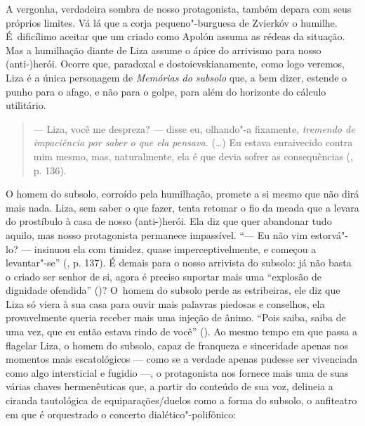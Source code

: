 A vergonha, verdadeira sombra de nosso protagonista, também depara com
seus próprios limites. Vá lá que a corja pequeno"-burguesa de Zvierkóv o
humilhe. É~dificílimo aceitar que um criado como Apolón assuma as rédeas
da situação. Mas a humilhação diante de Liza assume o ápice do arrivismo
para nosso \mbox{(anti-)herói}. Ocorre que, paradoxal e dostoievskianamente,
como logo veremos, Liza é a única personagem de \emph{Memórias do
subsolo} que, a bem dizer, estende o punho para o afago, e não para o
golpe, para além do horizonte do cálculo utilitário.

\begin{quote}
--- Liza, você me despreza? --- disse eu, olhando"-a fixamente,
\emph{tremendo de impaciência por saber o que ela pensava.} (\ldots) Eu
estava enraivecido contra mim mesmo, mas, naturalmente, ela é que devia
sofrer as consequências (, p. 136).
\end{quote}

O homem do subsolo, corroído pela humilhação, promete a si mesmo que não
dirá mais nada. Liza, sem saber o que fazer, tenta retomar o fio da
meada que a levara do prostíbulo à casa de nosso \mbox{(anti-)herói}. Ela diz
que quer abandonar tudo aquilo, mas nosso protagonista permanece
impassível. ``--- Eu não vim estorvá"-lo? --- insinuou ela com timidez,
quase imperceptivelmente, e começou a levantar"-se'' (, p. 137). É
demais para o nosso arrivista do subsolo: já não basta o criado ser
senhor de si, agora é preciso suportar mais uma ``explosão de dignidade
ofendida'' ()? O~homem do subsolo perde as estribeiras, ele diz
que Liza só viera à sua casa para ouvir mais palavras piedosas e
conselhos, ela provavelmente queria receber mais uma injeção de ânimo.
``Pois saiba, saiba de uma vez, que eu então estava rindo de você''
(). Ao mesmo tempo em que passa a flagelar Liza, o homem do
subsolo, capaz de franqueza e sinceridade apenas nos momentos mais
escatológicos --- como se a verdade apenas pudesse ser vivenciada como
algo intersticial e fugidio ---, o protagonista nos fornece mais uma de
suas várias chaves hermenêuticas que, a partir do conteúdo de sua voz,
delineia a ciranda tautológica de equiparações/duelos como a forma do
subsolo, o anfiteatro em que é orquestrado o concerto
dialético"-polifônico:

